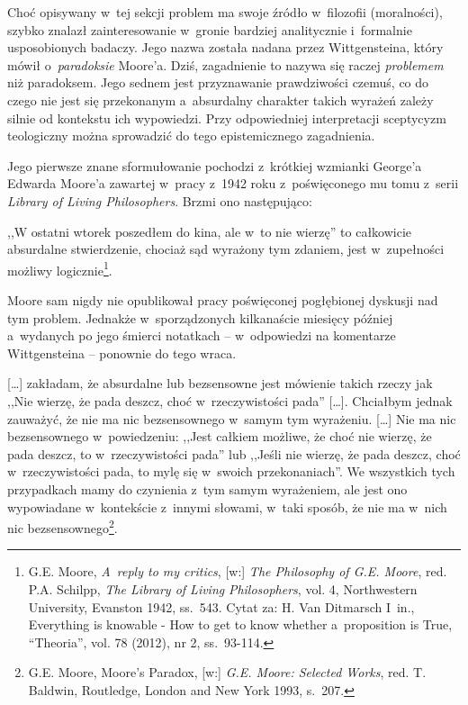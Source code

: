 Choć opisywany w~tej sekcji problem ma swoje źródło w~filozofii (moralności), szybko znalazł zainteresowanie w~gronie bardziej analitycznie i~formalnie usposobionych badaczy. Jego nazwa została nadana przez Wittgensteina, który mówił o~\textit{paradoksie} Moore'a. Dziś, zagadnienie to nazywa się raczej \textit{problemem} niż paradoksem. Jego sednem jest przyznawanie prawdziwości czemuś, co do czego nie jest się przekonanym a~absurdalny charakter takich wyrażeń zależy silnie od kontekstu ich wypowiedzi. Przy odpowiedniej interpretacji sceptycyzm teologiczny można sprowadzić do tego epistemicznego zagadnienia.

Jego pierwsze znane sformułowanie pochodzi z~krótkiej wzmianki George'a Edwarda Moore'a zawartej w~pracy z~1942 roku z~poświęconego mu tomu z~serii \textit{Library of Living Philosophers}. Brzmi ono następująco:

,,W ostatni wtorek poszedłem do kina, ale w~to nie wierzę'' to całkowicie absurdalne stwierdzenie, chociaż sąd wyrażony tym zdaniem, jest w~zupełności możliwy logicznie\footnote{G.E. Moore, \textit{A~reply to my critics}, [w:] \textit{The Philosophy of G.E. Moore}, red. P.A. Schilpp, \textit{The Library of Living} \textit{Philosophers}, vol. 4, Northwestern University, Evanston 1942, ss.~543. Cytat za: H. Van Ditmarsch I~in., Everything is knowable - How to get to know whether a~proposition is True, ``Theoria'', vol. 78 (2012), nr 2, ss.~93-114.}.

Moore sam nigdy nie opublikował pracy poświęconej pogłębionej dyskusji nad tym problem. Jednakże w~sporządzonych kilkanaście miesięcy później a~wydanych po jego śmierci notatkach -- w~odpowiedzi na komentarze Wittgensteina -- ponownie do tego wraca.

[…] zakładam, że absurdalne lub bezsensowne jest mówienie takich rzeczy jak ,,Nie wierzę, że pada deszcz, choć w~rzeczywistości pada'' […]. Chciałbym jednak zauważyć, że nie ma nic bezsensownego w~samym tym wyrażeniu. […] Nie ma nic bezsensownego w~powiedzeniu: ,,Jest całkiem możliwe, że choć nie wierzę, że pada deszcz, to w~rzeczywistości pada'' lub ,,Jeśli nie wierzę, że pada deszcz, choć w~rzeczywistości pada, to mylę się w~swoich przekonaniach''. We wszystkich tych przypadkach mamy do czynienia z~tym samym wyrażeniem, ale jest ono wypowiadane w~kontekście z~innymi słowami, w~taki sposób, że nie ma w~nich nic bezsensownego\footnote{G.E. Moore, Moore's Paradox, [w:] \textit{G.E. Moore: Selected Works}, red. T. Baldwin, Routledge, London and New York 1993, s.~207.}.

